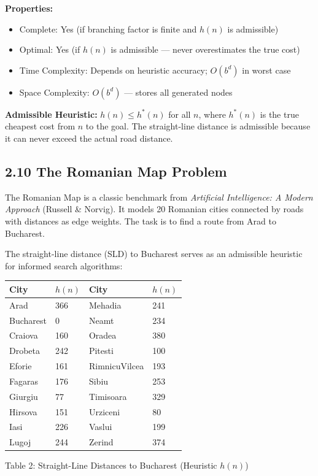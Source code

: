 \documentclass[12pt,a4paper]{article}
\begin{document}
\textbf{Properties:}
\begin{itemize}[leftmargin=1.4em]
  \item Complete: Yes (if branching factor is finite and $h(n)$ is admissible)
  \item Optimal: Yes (if $h(n)$ is admissible --- never overestimates the true cost)
  \item Time Complexity: Depends on heuristic accuracy; $O(b^d)$ in worst case
  \item Space Complexity: $O(b^d)$ --- stores all generated nodes
\end{itemize}

\textbf{Admissible Heuristic:} $h(n) \leq h^*(n)$ for all $n$, where $h^*(n)$ is the true cheapest cost from $n$ to the goal. The straight-line distance is admissible because it can never exceed the actual road distance.

\subsection*{2.10 The Romanian Map Problem}

The Romanian Map is a classic benchmark from \textit{Artificial Intelligence: A Modern Approach} (Russell \& Norvig). It models 20 Romanian cities connected by roads with distances as edge weights. The task is to find a route from Arad to Bucharest.

The straight-line distance (SLD) to Bucharest serves as an admissible heuristic for informed search algorithms:

\begin{center}
\begin{tabular}{@{}llll@{}}
\toprule
\textbf{City} & \textbf{$h(n)$} & \textbf{City} & \textbf{$h(n)$} \\
\midrule
Arad & 366 & Mehadia & 241 \\
Bucharest & 0 & Neamt & 234 \\
Craiova & 160 & Oradea & 380 \\
Drobeta & 242 & Pitesti & 100 \\
Eforie & 161 & RimnicuVilcea & 193 \\
Fagaras & 176 & Sibiu & 253 \\
Giurgiu & 77 & Timisoara & 329 \\
Hirsova & 151 & Urziceni & 80 \\
Iasi & 226 & Vaslui & 199 \\
Lugoj & 244 & Zerind & 374 \\
\bottomrule
\end{tabular}
\end{center}
\begin{center}
\small Table 2: Straight-Line Distances to Bucharest (Heuristic $h(n)$)
\end{center}
\end{document}
